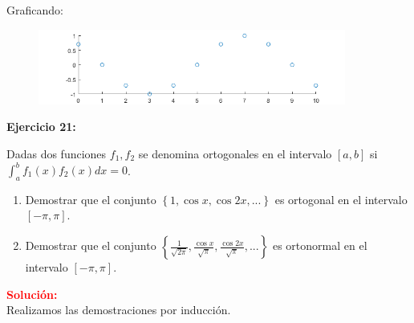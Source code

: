\documentclass[12pt]{article}
\begin{document}
Graficando:

\begin{figure}[htbp]
    \centering
    \includegraphics[width=0.9\textwidth]{seno.png}
\end{figure}


%
\noindent \textbf{Ejercicio 21:}

Dadas dos funciones $f_1,f_2$ se denomina ortogonales en el intervalo $[a,b]$ si $\int_{a}^{b}f_1(x)f_2(x)dx=0$.
\begin{enumerate}[label=(\alph*)]
    \item Demostrar que el conjunto $\left\lbrace1,\cos{x},\cos{2x},...\right\rbrace$ es ortogonal en el intervalo $[-\pi,\pi]$.
    \item Demostrar que el conjunto $\left\lbrace\frac{1}{\sqrt{2\pi}},\frac{\cos{x}}{\sqrt{\pi}},\frac{\cos{2x}}{\sqrt{\pi}},...\right\rbrace$ es ortonormal en el intervalo $[-\pi,\pi]$.
\end{enumerate}

\noindent \textcolor{red}{\bf Solución:}\\

Realizamos las demostraciones por inducción.
\end{document}
